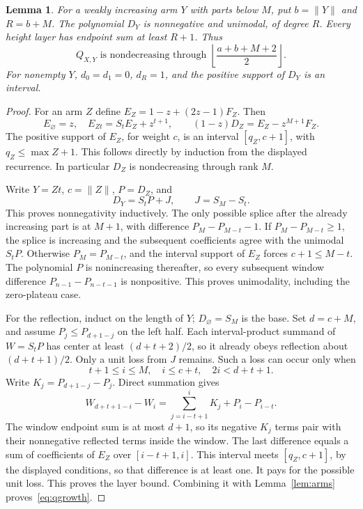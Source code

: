 \documentclass[11pt]{article}
\newtheorem{lemma}[theorem]{Lemma}
\theoremstyle{remark}\newtheorem{remark}[theorem]{Remark}
\newcommand{\wt}[1]{\lVert #1\rVert}
\begin{document}
\begin{lemma}\label{lem:kernel}
For a weakly increasing arm $Y$ with parts below $M$, put $b=\wt Y$ and $R=b+M$. The polynomial $D_Y$ is nonnegative and unimodal, of degree $R$. Every height layer has endpoint sum at least $R+1$. Thus
\begin{equation}\label{eq:qgrowth}
 Q_{X,Y}\text{ is nondecreasing through }
 \left\lfloor\frac{a+b+M+2}{2}\right\rfloor.
\end{equation}
For nonempty $Y$, $d_0=d_1=0$, $d_R=1$, and the positive support of $D_Y$ is an interval.
\end{lemma}
\begin{proof}
For an arm $Z$ define $E_Z=1-z+(2z-1)F_Z$. Then
\[
 E_\varnothing=z,\quad E_{Zt}=S_tE_Z+z^{t+1},\qquad
 (1-z)D_Z=E_Z-z^{M+1}F_Z.
\]
The positive support of $E_Z$, for weight $c$, is an interval $[q_Z,c+1]$, with $q_Z\le\max Z+1$. This follows directly by induction from the displayed recurrence. In particular $D_Z$ is nondecreasing through rank $M$.

Write $Y=Zt$, $c=\wt Z$, $P=D_Z$, and
\[
 D_Y=S_tP+J,\qquad J=S_M-S_t.
\]
This proves nonnegativity inductively. The only possible splice after the already increasing part is at $M+1$, with difference $P_M-P_{M-t}-1$. If $P_M-P_{M-t}\ge1$, the splice is increasing and the subsequent coefficients agree with the unimodal $S_tP$. Otherwise $P_M=P_{M-t}$, and the interval support of $E_Z$ forces $c+1\le M-t$. The polynomial $P$ is nonincreasing thereafter, so every subsequent window difference $P_{n-1}-P_{n-t-1}$ is nonpositive. This proves unimodality, including the zero-plateau case.

For the reflection, induct on the length of $Y$; $D_\varnothing=S_M$ is the base. Set $d=c+M$, and assume $P_j\le P_{d+1-j}$ on the left half. Each interval-product summand of $W=S_tP$ has center at least $(d+t+2)/2$, so it already obeys reflection about $(d+t+1)/2$. Only a unit loss from $J$ remains. Such a loss can occur only when
\[
 t+1\le i\le M,\quad i\le c+t,\quad 2i<d+t+1.
\]
Write $K_j=P_{d+1-j}-P_j$. Direct summation gives
\[
 W_{d+t+1-i}-W_i=\sum_{j=i-t+1}^{i}K_j+P_i-P_{i-t}.
\]
The window endpoint sum is at most $d+1$, so its negative $K_j$ terms pair with their nonnegative reflected terms inside the window. The last difference equals a sum of coefficients of $E_Z$ over $[i-t+1,i]$. This interval meets $[q_Z,c+1]$, by the displayed conditions, so that difference is at least one. It pays for the possible unit loss. This proves the layer bound. Combining it with Lemma~\ref{lem:arms} proves~\eqref{eq:qgrowth}.
\end{proof}
\end{document}

